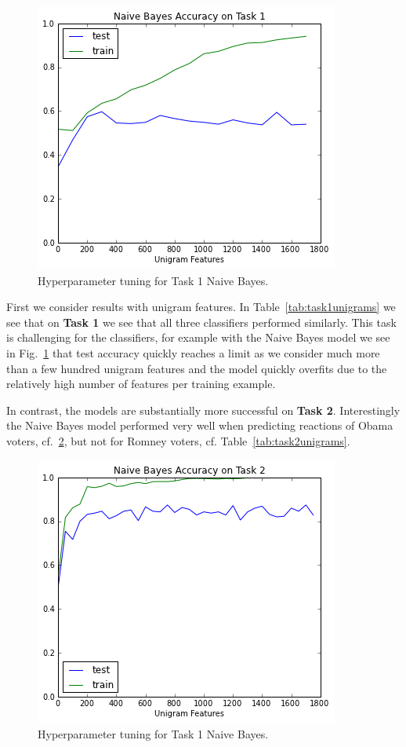 \begin{figure}[]
	\centering
	\includegraphics[scale=0.55]{Figures/ngrams_hyperparam_task1.png}
	\caption{Hyperparameter tuning for Task 1 Naive Bayes.}
	\label{fig:ngramstask1hyperparam}
\end{figure}

First we consider results with unigram features. In Table~\ref{tab:task1unigrams} we see that on \textbf{Task 1} we see that all three classifiers performed similarly.  This task is challenging for the classifiers, for example with the Naive Bayes model we see in Fig.~\ref{fig:ngramstask1hyperparam} that test accuracy quickly reaches a limit as we consider much more than a few hundred unigram features and the model quickly overfits due to the relatively high number of features per training example.

In contrast, the models are substantially more successful on \textbf{Task 2}.  Interestingly the Naive Bayes model performed very well when predicting reactions of Obama voters, cf.~\ref{fig:ngramstask2hyperparam}, but not for Romney voters, cf. Table~\ref{tab:task2unigrams}.  

\begin{figure}[]
	\centering
	\includegraphics[scale=0.60]{Figures/ngrams_hyperparam_task2.png}
	\caption{Hyperparameter tuning for Task 1 Naive Bayes.}
	\label{fig:ngramstask2hyperparam}
\end{figure}


